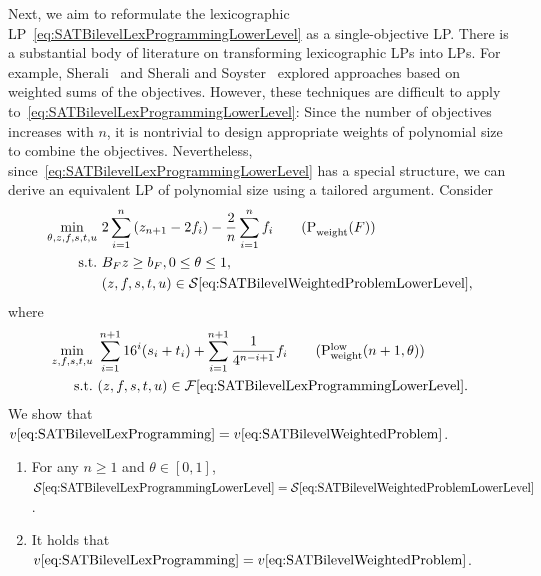 \documentclass[runningheads,orivec]{llncs}
\newcommand{\MacroColor}[1]{#1}
\newcommand{\NVariables}{\MacroColor{n}}
\newcommand{\OptValFunc}{\MacroColor{v}}
\newcommand{\OptSolSet}{\MacroColor{\mathcal{S}}}
\newcommand{\FeasSolSet}{\MacroColor{\mathcal{F}}}
\newcommand{\SATBooleanFormula}{\MacroColor{F}}
\newcommand{\ReformZ}{\MacroColor{z}}
\newcommand{\ReformAugFrac}{\MacroColor{f}}
\newcommand{\LexUVar}{\MacroColor{\theta}}
\newcommand{\LexLVarS}{\MacroColor{s}}
\newcommand{\LexLVarT}{\MacroColor{t}}
\newcommand{\LexLVarU}{\MacroColor{u}}
\newcommand{\LexWeightValue}{\MacroColor{16}}
\begin{document}
Next, we aim to reformulate the lexicographic LP~\eqref{eq:SATBilevelLexProgrammingLowerLevel} as a single-objective LP.  
There is a substantial body of literature on transforming lexicographic LPs into LPs.  
For example, Sherali~\cite{sherali1982equivalent} and Sherali and Soyster~\cite{sherali1983preemptive} explored approaches based on weighted sums of the objectives.  
However, these techniques are difficult to apply to~\eqref{eq:SATBilevelLexProgrammingLowerLevel}: Since the number of objectives increases with $\NVariables$, it is nontrivial to design appropriate weights of polynomial size to combine the objectives.
Nevertheless, since~\eqref{eq:SATBilevelLexProgrammingLowerLevel} has a special structure, we can derive an equivalent LP of polynomial size using a tailored argument.
Consider
\begin{align}
\min_{\LexUVar, \ReformZ, \ReformAugFrac, \LexLVarS, \LexLVarT, \LexLVarU} \ & 
2 \sum_{i = 1}^{n} \left(\ReformZ_{\NVariables + 1} - 2 \ReformAugFrac_i \right) - \frac{2}{n} \sum_{i = 1}^n \ReformAugFrac_i
\tag{P${}_{\text{weight}}^{\text{}}(\SATBooleanFormula)$}
\label{eq:SATBilevelWeightedProblem}
\\
\text{s.t.} \ &
B_{\SATBooleanFormula} \ReformZ \ge b_{\SATBooleanFormula}, 
0 \le \LexUVar \le 1, \notag \\
&
(\ReformZ, \ReformAugFrac, \LexLVarS, \LexLVarT, \LexLVarU) 
\in
\OptSolSet\eqref{eq:SATBilevelWeightedProblemLowerLevel},
\notag 
\end{align}
where
\begin{align}
\min_{\ReformZ, \ReformAugFrac, \LexLVarS, \LexLVarT, \LexLVarU} \ & 
\sum_{i = 1}^{\NVariables + 1}
\LexWeightValue^i (\LexLVarS_i + \LexLVarT_i)
+ 
\sum_{i = 1}^{\NVariables + 1} \frac{1}{4^{\NVariables - i + 1}} \ReformAugFrac_i
\tag{P${}_{\text{weight}}^{\text{low}}(\NVariables + 1, \LexUVar)$}
\label{eq:SATBilevelWeightedProblemLowerLevel}
\\
\text{s.t.} \
&
(\ReformZ, \ReformAugFrac, \LexLVarS, \LexLVarT, \LexLVarU)
\in
\FeasSolSet\eqref{eq:SATBilevelLexProgrammingLowerLevel}.
\notag 
\end{align}
We show that $\OptValFunc\eqref{eq:SATBilevelLexProgramming} = \OptValFunc\eqref{eq:SATBilevelWeightedProblem}$.
\begin{lemma}
\label{lemma:LexToWeighted}
\mbox{}
\begin{enumerate}
\item
\label{lemma:LexToWeightedAssertionOne}
For any $\NVariables \ge 1$ and $\LexUVar \in [0, 1]$, $\OptSolSet\eqref{eq:SATBilevelLexProgrammingLowerLevel} = \OptSolSet\eqref{eq:SATBilevelWeightedProblemLowerLevel}$.
\item
It holds that $\OptValFunc\eqref{eq:SATBilevelLexProgramming} = \OptValFunc\eqref{eq:SATBilevelWeightedProblem}$.
\end{enumerate}
\end{lemma}
\end{document}
